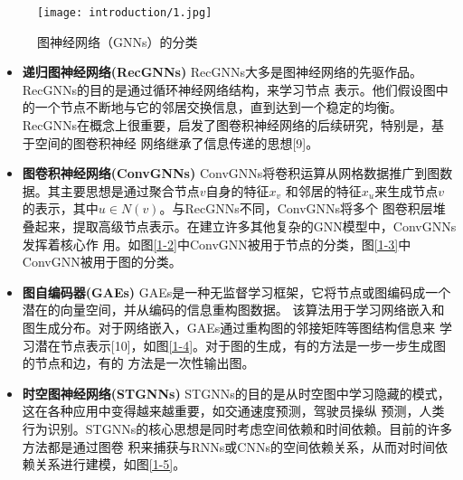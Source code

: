\begin{figure}[ht]
    \centering
    \texttt{[image: introduction/1.jpg]}
    \caption{\label{1-1}图神经网络（GNNs）的分类}
\end{figure}

\begin{itemize}
    \item \textbf{递归图神经网络(RecGNNs)} \quad
    RecGNNs大多是图神经网络的先驱作品。RecGNNs的目的是通过循环神经网络结构，来学习节点
    表示。他们假设图中的一个节点不断地与它的邻居交换信息，直到达到一个稳定的均衡。
    RecGNNs在概念上很重要，启发了图卷积神经网络的后续研究，特别是，基于空间的图卷积神经
    网络继承了信息传递的思想[9]。
    
    \item \textbf{图卷积神经网络(ConvGNNs)} \quad
    ConvGNNs将卷积运算从网格数据推广到图数据。其主要思想是通过聚合节点$v$自身的特征$x_{v}$
    和邻居的特征$x_{u}$来生成节点$v$的表示，其中$u\in N(v)$。与RecGNNs不同，ConvGNNs将多个
    图卷积层堆叠起来，提取高级节点表示。在建立许多其他复杂的GNN模型中，ConvGNNs发挥着核心作
    用。如图\ref{1-2}中ConvGNN被用于节点的分类，图\ref{1-3}中ConvGNN被用于图的分类。

    \item \textbf{图自编码器(GAEs)} \quad
    GAEs是一种无监督学习框架，它将节点或图编码成一个潜在的向量空间，并从编码的信息重构图数据。
    该算法用于学习网络嵌入和图生成分布。对于网络嵌入，GAEs通过重构图的邻接矩阵等图结构信息来
    学习潜在节点表示[10]，如图\ref{1-4}。对于图的生成，有的方法是一步一步生成图的节点和边，有的
    方法是一次性输出图。

    \item \textbf{时空图神经网络(STGNNs)} \quad
    STGNNs的目的是从时空图中学习隐藏的模式，这在各种应用中变得越来越重要，如交通速度预测，驾驶员操纵
    预测，人类行为识别。STGNNs的核心思想是同时考虑空间依赖和时间依赖。目前的许多方法都是通过图卷
    积来捕获与RNNs或CNNs的空间依赖关系，从而对时间依赖关系进行建模，如图\ref{1-5}。
\end{itemize}

